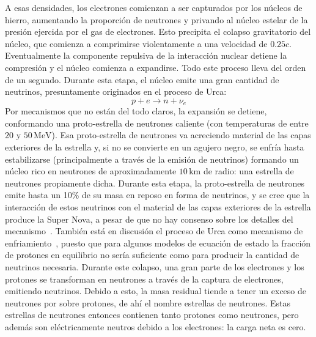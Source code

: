 A esas densidades, los electrones comienzan a ser capturados por los núcleos de hierro, aumentando la proporción de neutrones y privando al núcleo estelar de la presión ejercida por el gas de electrones.
Esto precipita el colapso gravitatorio del núcleo, que comienza a comprimirse violentamente a una velocidad de $0.25c$.
Eventualmente la componente repulsiva de la interacción nuclear detiene la compresión y el núcleo comienza a expandirse.
Todo este proceso lleva del orden de un segundo.
Durante esta etapa, el núcleo emite una gran cantidad de neutrinos, presuntamente originados en el proceso de Urca:
\begin{equation}
  p + e\rightarrow n + \nu_e
\end{equation}
Por mecanismos que no están del todo claros, la expansión se detiene, conformando una proto-estrella de neutrones caliente (con temperaturas de entre $20$ y $50\,\text{MeV}$).
Esa proto-estrella de neutrones va acreciendo material de las capas exteriores de la estrella y, si no se convierte en un agujero negro, se enfría hasta estabilizarse (principalmente a través de la emisión de neutrinos) formando un núcleo rico en neutrones de aproximadamente $10\,\text{km}$ de radio: una estrella de neutrones propiamente dicha.
Durante esta etapa, la proto-estrella de neutrones emite hasta un 10\% de su masa en reposo en forma de neutrinos, y se cree que la interacción de estos neutrinos con el material de las capas exteriores de la estrella produce la Super Nova, a pesar de que no hay consenso sobre los detalles del mecanismo~\cite{woosley_physics_2005, bethe_supernova_1990}.
También está en discusión el proceso de Urca como mecanismo de enfriamiento~\cite{piekarewicz_proton_2012, lattimer_direct_1991}, puesto que para algunos modelos de ecuación de estado la fracción de protones en equilibrio no sería suficiente como para producir la cantidad de neutrinos necesaria.
Durante este colapso, una gran parte de los electrones y los protones se transforman en neutrones a través de la captura de electrones, emitiendo neutrinos.
Debido a esto, la masa residual tiende a tener un exceso de neutrones por sobre protones, de ahí el nombre estrellas de neutrones.
Estas estrellas de neutrones entonces contienen tanto protones como neutrones, pero además son eléctricamente neutros debido a los electrones: la carga neta es cero.


